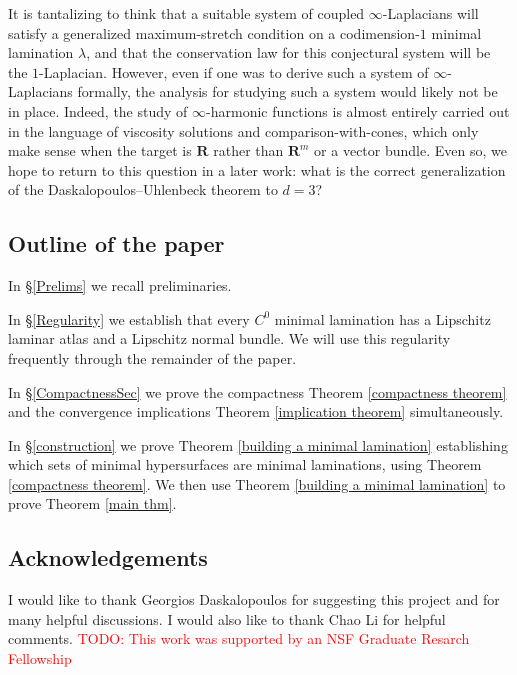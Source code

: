 \documentclass[reqno,11pt]{amsart}
\newcommand{\RR}{\mathbf{R}}
\theoremstyle{definition}
\numberwithin{equation}{section}
\newcommand\todo[1]{\textcolor{red}{TODO: #1}}
\begin{document}
It is tantalizing to think that a suitable system of coupled $\infty$-Laplacians will satisfy a generalized maximum-stretch condition on a codimension-$1$ minimal lamination $\lambda$, and that the conservation law for this conjectural system will be the $1$-Laplacian.
However, even if one was to derive such a system of $\infty$-Laplacians formally, the analysis for studying such a system would likely not be in place.
Indeed, the study of $\infty$-harmonic functions is almost entirely carried out in the language of viscosity solutions and comparison-with-cones, which only make sense when the target is $\RR$ rather than $\RR^m$ or a vector bundle.
Even so, we hope to return to this question in a later work: what is the correct generalization of the Daskalopoulos--Uhlenbeck theorem to $d = 3$?

\subsection{Outline of the paper}
In \S\ref{Prelims} we recall preliminaries.

In \S\ref{Regularity} we establish that every $C^0$ minimal lamination has a Lipschitz laminar atlas and a Lipschitz normal bundle.
We will use this regularity frequently through the remainder of the paper.

In \S\ref{CompactnessSec} we prove the compactness Theorem \ref{compactness theorem} and the convergence implications Theorem \ref{implication theorem} simultaneously.

In \S\ref{construction} we prove Theorem \ref{building a minimal lamination} establishing which sets of minimal hypersurfaces are minimal laminations, using Theorem \ref{compactness theorem}.
We then use Theorem \ref{building a minimal lamination} to prove Theorem \ref{main thm}.



\subsection{Acknowledgements}
I would like to thank Georgios Daskalopoulos for suggesting this project and for many helpful discussions.
I would also like to thank Chao Li for helpful comments.
\todo{This work was supported by an NSF Graduate Resarch Fellowship}



\end{document}
